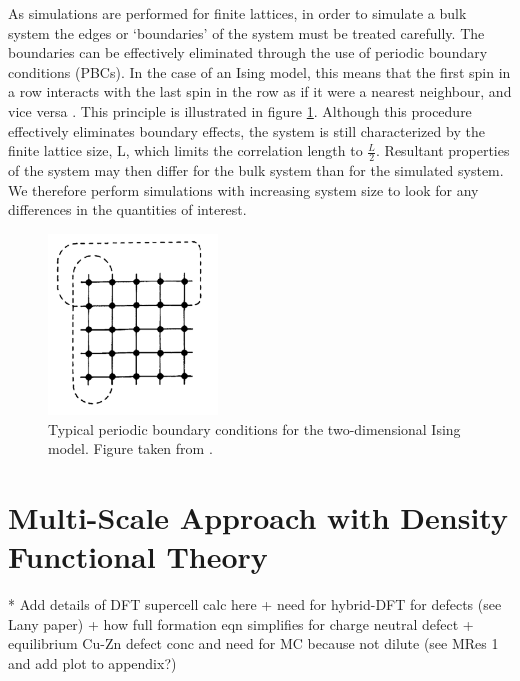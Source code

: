 As simulations are performed for finite lattices, in order to simulate a bulk system the edges or `boundaries' of the system must be treated carefully. The boundaries can be effectively eliminated through the use of periodic boundary conditions (PBCs). In the case of an Ising model, this means that the first spin in a row interacts with the last spin in the row as if it were a nearest neighbour, and vice versa \cite{MC_Landau}. This principle is illustrated in figure \ref{MC_PBCs}. Although this procedure effectively eliminates boundary effects, the system is still characterized by the finite lattice size, L, which limits the correlation length to $\frac{L}{2}$. Resultant properties of the system may then differ for the bulk system than for the simulated system. We therefore perform simulations with increasing system size to look for any differences in the quantities of interest.

\begin{figure}[h!]
  \centering
    \includegraphics[width=0.4\textwidth]{figures/MC_PBCs.png}
    \caption{Typical periodic boundary conditions for the two-dimensional Ising model. Figure taken from .}
  \label{MC_PBCs}
\end{figure}

\section{Multi-Scale Approach with Density Functional Theory}\label{MC_DFT}
* Add details of DFT supercell calc here + need for hybrid-DFT for defects (see Lany paper) + how full formation eqn simplifies for charge neutral defect + equilibrium Cu-Zn defect conc and need for MC because not dilute (see MRes 1 and add plot to appendix?)\\

